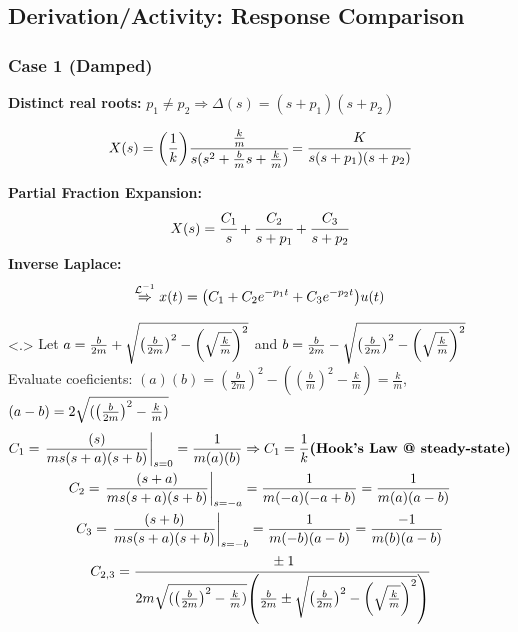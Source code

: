 \documentclass[aspectratio=169,handout]{beamer}
\begin{document}
\subsection{Derivation/Activity: Response Comparison}
\begin{frame}
	\frametitle{Case 1 (Damped)}

	\textbf{Distinct real roots:}
	$p_1 \neq p_2 \Rightarrow \Delta(s) = (s+p_1) (s+p_2)$

	\pause{}
	\[
		X(s) = \qty(\frac{1}{k}) \cfrac{\frac{k}{m}}{s(s^2 + \frac{b}{m} s + \frac{k}{m})}
		= \cfrac{K}{s(s+p_1)(s+p_2)}
	\]
	\pause{}

	\textbf{Partial Fraction Expansion:} %
	\[
		X(s) = \cfrac{C_1}{s} + \cfrac{C_2}{s+p_1} + \cfrac{C_3}{s+p_2}
	\]
	\pause{}
	\textbf{Inverse Laplace:}
	\[
		\overset{\mathcal{L}^{-1}}{\Rightarrow}
		x(t) = \qty(C_1 + C_2 e^{-p_1t} + C_3 e^{-p_2t}) u(t)	
	\]

	{
		Let $a = \frac{b}{2m} + \sqrt{\qty(\frac{b}{2m})^2 - \qty(\sqrt{\frac{k}{m}})^2}$ and $b = \frac{b}{2m} - \sqrt{\qty(\frac{b}{2m})^2 - \qty(\sqrt{\frac{k}{m}})^2}$
		Evaluate coeficients:
		$(a)(b) = (\frac{b}{2m})^2 - ((\frac{b}{m})^2-\frac{k}{m}) = \frac{k}{m}$, \quad $(a-b) = 2\sqrt{(\qty(\frac{b}{2m})^2 - \frac{k}{m})}$
		\begin{gather*}
			C_1 = \eval{\frac{(s)}{m s(s+a)(s+b)}}_{s=0}
			= \frac{1}{m (a)(b)}
			\Rightarrow
			C_1 = \frac{1}{k} \textbf{(Hook's Law @ steady-state)}
			\\
			C_2 = \eval{\frac{(s+a)}{m s(s+a)(s+b)}}_{s=-a}
			= \frac{1}{m(-a)(-a+b)}
			= \frac{1}{m(a)(a-b)}
			\\
			C_3 = \eval{\frac{(s+b)}{m s(s+a)(s+b)}}_{s=-b}
			= \frac{1}{m(-b)(a-b)}
			= \frac{-1}{m(b)(a-b)}\\
			C_{2,3} = \cfrac{\pm 1}{2m\sqrt{(\qty(\frac{b}{2m})^2 - \frac{k}{m})} \qty(\frac{b}{2m} \pm \sqrt{\qty(\frac{b}{2m})^2 - \qty(\sqrt{\frac{k}{m}})^2})}
		\end{gather*}
	}
	
\end{frame}
\end{document}
